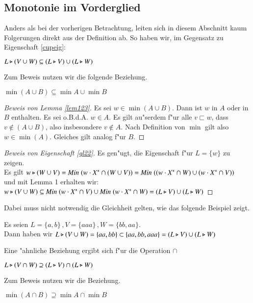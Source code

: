 \subsection{Monotonie im Vorderglied}
Anders als bei der vorherigen Betrachtung, leiten sich in diesem Abschnitt kaum Folgerungen direkt aus der Definition ab.
So haben wir, im Gegensatz zu Eigenschaft \ref{cupeig}:
\begin{eigen}\label{gl22}
$L\triangleright (V\cup W)\subseteq (L\triangleright V) \cup (L\triangleright W)$
\end{eigen}
Zum Beweis nutzen wir die folgende Beziehung.
\begin{lem}\label{lem123}
$\min (A\cup B) \subseteq \min A \cup \min B$
\end{lem}

\begin{proof}[Beweis von Lemma \ref{lem123}]
Es sei $w\in \min (A\cup B)$. Dann ist $w$ in $A$ oder in $B$ enthalten. Es sei o.B.d.A. $w\in A$. Es gilt au"serdem f"ur alle $v\sqsubset w$, dass $v\notin (A\cup B)$, also insbesondere $v\notin A$. Nach Definition von $\min$ gilt also $w\in\min(A)$. Gleiches gilt analog f"ur $B$.
\end{proof}
\begin{proof}[Beweis von Eigenschaft \ref{gl22}]
Es gen"ugt, die Eigenschaft f"ur $L=\{w\}$ zu zeigen.\\
Es gilt $w \triangleright (W\cup V)=\mathit{Min}\; (w\cdot X^* \cap (W\cup V)) =\mathit{Min}\; ((w\cdot X^* \cap W) \cup (w\cdot X^* \cap V))$\\
und mit Lemma 1 erhalten wir:\\
$ w\triangleright (V\cup W) \subseteq \mathit{Min}\; (w\cdot X^* \cap V) \cup \mathit{Min}\; (w\cdot X^* \cap W)=(L\triangleright V)\cup (L\triangleright W)$
\end{proof}
Dabei muss nicht notwendig die Gleichheit gelten, wie das folgende Beispiel zeigt.
\begin{beispiel}
Es seien $L= \{a,b\}\, ,V =\{aaa\}\, ,W = \{bb,aa\}$. \\Dann haben wir $L\triangleright (V\cup W)=\{aa,bb\} \subset \{aa,bb,aaa\} = (L\triangleright V) \cup (L\triangleright W)$
\end{beispiel}

Eine "ahnliche Beziehung ergibt sich f"ur die Operation $\cap$

\begin{gleich}\label{eigen321}
$L\triangleright (V\cap W)\supseteq (L\triangleright V) \cap (L\triangleright W)$
\end{gleich}
Zum Beweis nutzen wir die Beziehung.
\begin{lem}\label{lem321}
$\min(A\cap B) \supseteq \min A \cap \min B$
\end{lem}

